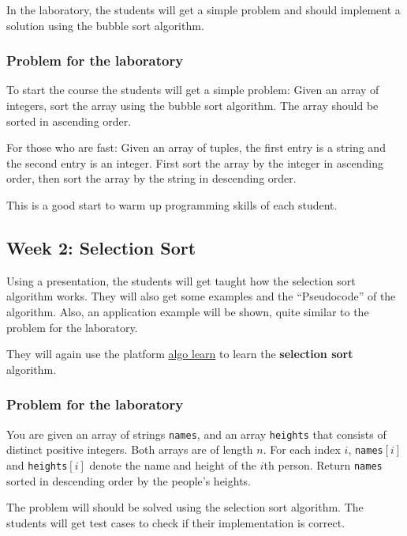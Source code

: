 \documentclass[10pt, oneside]{article}
\theoremstyle{remark}
\begin{document}
In the laboratory, the students will get a simple problem and should implement a solution using the bubble sort algorithm.

\subsubsection*{Problem for the laboratory}
\begin{tcolorbox}
  To start the course the students will get a simple problem: Given an array of integers, sort the array using the bubble sort algorithm. The array should be sorted in ascending order. 

  For those who are fast: Given an array of tuples, the first entry is a string and the second entry is an integer. First sort the array by the integer in ascending order, then sort the array by the string in descending order.
\end{tcolorbox}
This is a good start to warm up programming skills of each student.

\subsection{Week 2: Selection Sort}
Using a presentation, the students will get taught how the selection sort algorithm works. They will also get some examples and the \enquote{Pseudocode} of the algorithm. Also, an application example will be shown, quite similar to the problem for the laboratory. 

They will again use the platform \href{https://tcs.uni-frankfurt.de/algo-learn-testing/refs_heads_feat-bubbleSort/en
}{algo learn} to learn the \textbf{selection sort} algorithm. 

\subsubsection*{Problem for the laboratory}
\begin{tcolorbox}
  You are given an array of strings \texttt{names}, and an array \texttt{heights} that consists of distinct positive integers. Both arrays are of length $n$. For each index $i$, \texttt{names}$[i]$ and \texttt{heights}$[i]$ denote the name and height of the $i$th person. Return \texttt{names} sorted in descending order by the people's heights.
\end{tcolorbox}
The problem will should be solved using the selection sort algorithm. The students will get test cases to check if their implementation is correct.
\end{document}
